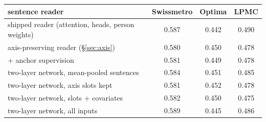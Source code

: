 \begin{tabular}{lccc}
\toprule
sentence reader & Swissmetro & Optima & LPMC \\
\midrule
shipped reader (attention, heads, person weights) & 0.587 & 0.442 & 0.490 \\
axis-preserving reader (\S\ref{sec:axis}) & 0.580 & 0.450 & 0.478 \\
\quad + anchor supervision & 0.581 & 0.449 & 0.478 \\
two-layer network, mean-pooled sentences & 0.584 & 0.451 & 0.485 \\
two-layer network, axis slots kept & 0.581 & 0.452 & 0.478 \\
two-layer network, slots + covariates & 0.582 & 0.450 & 0.475 \\
two-layer network, all inputs & 0.589 & 0.445 & 0.486 \\
\bottomrule
\end{tabular}
